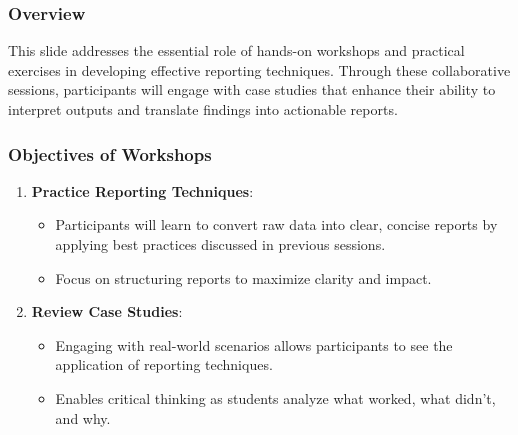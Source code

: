 \documentclass{beamer}
\begin{document}
\begin{frame}[fragile]
    \frametitle{Overview}
    This slide addresses the essential role of hands-on workshops and practical exercises in developing effective reporting techniques. 
    Through these collaborative sessions, participants will engage with case studies that enhance their ability to interpret outputs and translate findings into actionable reports.
\end{frame}

\begin{frame}[fragile]
    \frametitle{Objectives of Workshops}
    \begin{enumerate}
        \item \textbf{Practice Reporting Techniques}:
            \begin{itemize}
                \item Participants will learn to convert raw data into clear, concise reports by applying best practices discussed in previous sessions.
                \item Focus on structuring reports to maximize clarity and impact.
            \end{itemize}

        \item \textbf{Review Case Studies}:
            \begin{itemize}
                \item Engaging with real-world scenarios allows participants to see the application of reporting techniques.
                \item Enables critical thinking as students analyze what worked, what didn’t, and why.
            \end{itemize}
    \end{enumerate}
\end{frame}
\end{document}
